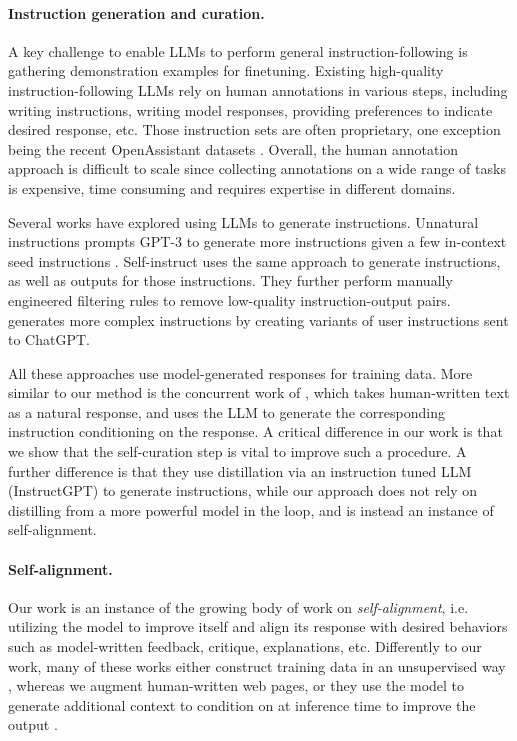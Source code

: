\vspace{-2mm}
\paragraph{Instruction generation and curation.} A key challenge to enable LLMs to perform general instruction-following is gathering demonstration examples for finetuning. Existing high-quality instruction-following LLMs rely on human annotations in various steps, including writing instructions, writing model responses, providing preferences to indicate desired response, etc. Those instruction sets are often proprietary, one exception being the recent OpenAssistant datasets \citep{kopf2023openassistant}. Overall, the human annotation approach is difficult to scale since collecting annotations on a wide range of tasks is expensive, time consuming and requires expertise in different domains. 

Several works have explored using LLMs to generate instructions. Unnatural instructions prompts GPT-3 to generate more instructions given a few in-context seed instructions \citep{honovich2022unnatural}. Self-instruct \citep{wang2022self} uses the same approach to generate instructions, as well as outputs for those instructions. They further perform manually engineered filtering rules to remove low-quality instruction-output pairs. \citet{xu2023wizardlm} generates more complex instructions by creating variants of user instructions sent to ChatGPT.  

All these approaches use model-generated responses for training data. More similar to our method is the concurrent work  of \citet{koksal2023longform}, which takes human-written text as a natural response, and uses the LLM to generate the corresponding instruction conditioning on the response. A critical difference in our work is that we show that the self-curation step is vital to improve such a procedure.
A further difference is that they use distillation via an instruction tuned LLM (InstructGPT) to generate instructions, while our approach does not rely on distilling from a more powerful model in the loop, and is instead an instance of self-alignment. 
\vspace{-2mm}
\paragraph{Self-alignment.} Our work is  an instance of the growing body of work on \textit{self-alignment}, i.e. utilizing the model to improve itself and  align its response with desired behaviors such as model-written feedback, critique, explanations, etc. Differently to our work, many of these works either construct training data in an unsupervised way
\citep{sun2023principledriven,bai2022constitutional}, whereas we augment human-written web pages,
or they use the model to generate additional context to condition on at inference time to improve the output \citep{saunders2022self, zhang2023self,madaan2023self}.


